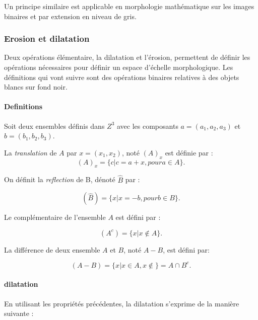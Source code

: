 Un principe similaire est applicable en morphologie mathématique sur les images binaires et par extension en niveau de gris.

\subsubsection{Erosion et dilatation }

Deux opérations élémentaire, la dilatation et l'érosion, permettent de définir les opérations nécessaires pour définir un espace d'échelle morphologique. Les définitions qui vont suivre sont des opérations binaires relatives à des objets blancs sur fond noir.

\paragraph{Definitions}
Soit deux ensembles définis dans $Z^3$ avec les composants $a=(a_1,a_2,a_3)$ et $b=(b_1,b_2,b_3)$.

La \emph{translation} de $A$ par $x = (x_1,x_2)$, noté $(A)_x$ est définie par :
\begin{equation}
  (A)_x = \{c|c = a+x, pour a \in A\}. 
\end{equation}

On définit la \emph{reflection} de B, dénoté $\widehat{B}$ par :

\begin{equation}
  (\widehat{B}) = \{x|x = -b, pour b \in B\}. 
\end{equation}

Le complémentaire de l'ensemble $A$ est défini par :

\begin{equation}
  (A^c) = \{x|x \not\in A\}. 
\end{equation}

La différence de deux ensemble $A$ et $B$, noté $A - B$, est défini par:

\begin{equation}
  (A-B) = \{x|x \in A, x\not\in \} = A \cap B^c.  
\end{equation}


\paragraph{dilatation}
En utilisant les propriétés précédentes, la dilatation s'exprime de la manière suivante :


